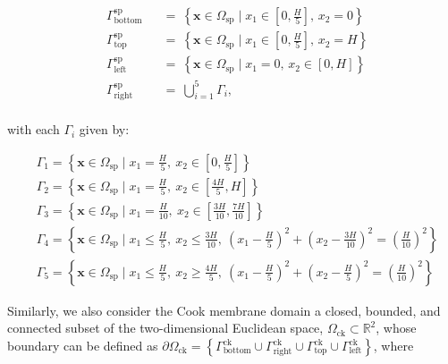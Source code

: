 \begin{equation*}
	\begin{aligned}
		&\Gamma_{\text{bottom}}^{\text{sp}} && = ~ \left\{ \mathbf{x} \in \Omega_{\text{sp}}\mid x_1 \in \left[ 0, \frac{H}{5}\right], \, x_2 = 0 \right\}\\
		&\Gamma_{\text{top}}^{\text{sp}} && = ~\left\{ \mathbf{x} \in \Omega_{\text{sp}} \mid x_1 \in \left[ 0, \frac{H}{5}\right], \, x_2 = H \right\}\\
		&\Gamma_{\text{left}}^{\text{sp}} && = ~ \left\{ \mathbf{x} \in \Omega_{\text{sp}} \mid x_1 = 0, \, x_2 \in \left[0,H\right] \right\}\\
		&\Gamma_{\text{right}}^{\text{sp}} &&= ~ \bigcup_{i=1}^{5}\Gamma_{i}, \\
	\end{aligned}
\end{equation*}

with each $ \Gamma_{i} $ given by:

{\small
\begin{equation*}
		\begin{aligned}
			&\Gamma_{1} = \left\{\mathbf{x} \in \Omega_{\text{sp}} \mid x_{1} = \frac{H}{5}, \ x_{2} \in \left[0,\frac{H}{5}\right] \right\} \\
			&\Gamma_{2} = \left\{\mathbf{x} \in \Omega_{\text{sp}} \mid x_{1} = \frac{H}{5}, \ x_{2} \in \left[\frac{4H}{5}, H\right] \right\} \\
			&\Gamma_{3} = \left\{\mathbf{x} \in \Omega_{\text{sp}} \mid x_{1} = \frac{H}{10}, \ x_{2} \in \left[\frac{3H}{10}, \frac{7H}{10}\right] \right\} \\
			&\Gamma_{4} = \left\{\mathbf{x} \in \Omega_{\text{sp}} \mid x_{1} \leq \frac{H}{5}, \ x_{2} \leq \frac{3H}{10}, \ \left(x_{1}-\frac{H}{5}\right)^2 + \left(x_{2}-\frac{3H}{10}\right)^2 = \left(\frac{H}{10}\right)^2\right\} \\
			&\Gamma_{5} = \left\{\mathbf{x} \in\Omega_{\text{sp}} \mid x_{1} \leq \frac{H}{5}, \ x_{2} \geq \frac{4H}{5}, \ \left(x_{1}-\frac{H}{5}\right)^2 + \left(x_{2}-\frac{H}{5}\right)^2 = \left(\frac{H}{10}\right)^2\right\}
		\end{aligned}
\end{equation*}
}

Similarly, we also consider the Cook membrane domain a closed, bounded, and connected subset of the two-dimensional Euclidean space, $ \Omega_{\text{ck}} \subset \mathbb{R}^{2} $, whose boundary can be defined as $ \partial \Omega_{\text{ck}} = \left\{\Gamma_{\text{bottom}}^{\text{ck}} \cup \Gamma_{\text{right}}^{\text{ck}} \cup \Gamma_{\text{top}}^{\text{ck}} \cup \Gamma_{\text{left}}^{\text{ck}} \right\} $, where

